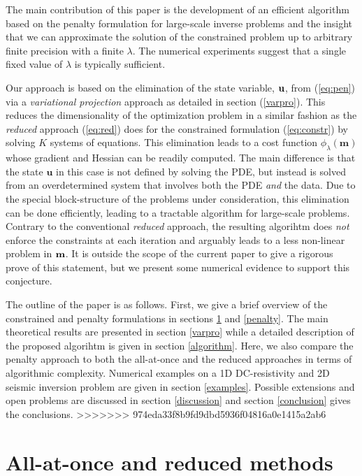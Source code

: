 \documentclass{iopart}
\begin{document}
{The main contribution of this paper is the development of an efficient algorithm based on the penalty formulation for large-scale inverse problems and the insight that we can approximate the solution of the constrained problem up to arbitrary finite precision with a finite $\lambda$. The numerical experiments suggest that a single fixed value of $\lambda$ is typically sufficient.

Our approach is based on the elimination of the state variable, $\mathbf{u}$, from (\ref{eq:pen}) via a \emph{variational projection} approach as detailed in section (\ref{varpro}). This reduces the dimensionality of the optimization problem in a similar fashion as the \emph{reduced} approach (\ref{eq:red}) does for the constrained formulation (\ref{eq:constr}) by solving $K$ systems of equations. This elimination leads to a cost function $\phi_{\lambda}(\mathbf{m})$ whose gradient and Hessian can be readily computed. The main difference is that the state $\mathbf{u}$ in this case is not defined by solving the PDE, but instead is solved from an overdetermined system that involves both the PDE \emph{and} the data. Due to the special block-structure of the problems under consideration, this elimination can be done efficiently, leading to a tractable algorithm for large-scale problems. Contrary to the conventional \emph{reduced} approach, the resulting algorihtm does \emph{not} enforce the constraints at each iteration and arguably leads to a less non-linear problem in $\mathbf{m}$. It is outside the scope of the current paper to give a rigorous prove of this statement, but we present some numerical evidence to support this conjecture.

The outline of the paper is as follows. First, we give a brief overview of the constrained and penalty formulations in sections \ref{lagrange} and \ref{penalty}. The main theoretical results are presented in section \ref{varpro} while a detailed description of the proposed algorihtm is given in section \ref{algorithm}. Here, we also compare the penalty approach to both the all-at-once and the reduced approaches in terms of algorithmic complexity. Numerical examples on a 1D DC-resistivity and 2D seismic inversion problem are given in section \ref{examples}. Possible extensions and open problems are discussed in section \ref{discussion} and section \ref{conclusion} gives the conclusions.
>>>>>>> 974eda33f8b9fd9dbd5936f04816a0e1415a2ab6

\section{All-at-once and reduced methods}
\label{lagrange}

}
\end{document}
